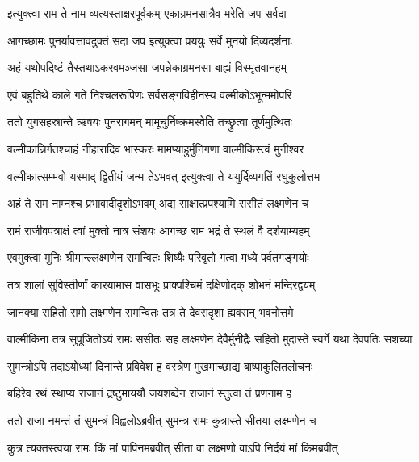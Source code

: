 \twolineshloka
{इत्युक्त्वा राम ते नाम व्यत्यस्ताक्षरपूर्वकम्}
{एकाग्रमनसात्रैव मरेति जप सर्वदा} %

\twolineshloka
{आगच्छामः पुनर्यावत्तावदुक्तं सदा जप}
{इत्युक्त्वा प्रययुः सर्वे मुनयो दिव्यदर्शनाः} %

\twolineshloka
{अहं यथोपदिष्टं तैस्तथाऽकरवमञ्जसा}
{जपन्नेकाग्रमनसा बाह्यं विस्मृतवानहम्} %

\twolineshloka
{एवं बहुतिथे काले गते निश्चलरूपिणः}
{सर्वसङ्गविहीनस्य वल्मीकोऽभून्ममोपरि} %

\twolineshloka
{ततो युगसहस्रान्ते ऋषयः पुनरागमन्}
{मामूचुर्निष्क्रमस्वेति तच्छ्रुत्वा तूर्णमुत्थितः} %

\twolineshloka
{वल्मीकान्निर्गतश्चाहं नीहारादिव भास्करः}
{मामप्याहुर्मुनिगणा वाल्मीकिस्त्वं मुनीश्वर} %

\twolineshloka
{वल्मीकात्सम्भवो यस्माद् द्वितीयं जन्म तेऽभवत्}
{इत्युक्त्वा ते ययुर्दिव्यगतिं रघुकुलोत्तम} %

\twolineshloka
{अहं ते राम नाम्नश्च प्रभावादीदृशोऽभवम्}
{अद्य साक्षात्प्रपश्यामि ससीतं लक्ष्मणेन च} %

\twolineshloka
{रामं राजीवपत्राक्षं त्वां मुक्तो नात्र संशयः}
{आगच्छ राम भद्रं ते स्थलं वै दर्शयाम्यहम्} %

\twolineshloka
{एवमुक्त्वा मुनिः श्रीमान्ल्लक्ष्मणेन समन्वितः}
{शिष्यैः परिवृतो गत्वा मध्ये पर्वतगङ्गयोः} %

\twolineshloka
{तत्र शालां सुविस्तीर्णां कारयामास वासभूः}
{प्राक्पश्चिमं दक्षिणोदक् शोभनं मन्दिरद्वयम्} %

\twolineshloka
{जानक्या सहितो रामो लक्ष्मणेन समन्वितः}
{तत्र ते देवसदृशा ह्यवसन् भवनोत्तमे} %

\fourlineindentedshloka
{वाल्मीकिना तत्र सुपूजितोऽयं}
{रामः ससीतः सह लक्ष्मणेन}
{देवैर्मुनीद्रैः सहितो मुदास्ते}
{स्वर्गे यथा देवपतिः सशच्या} %





\twolineshloka
{सुमन्त्रोऽपि तदाऽयोध्यां दिनान्ते प्रविवेश ह}
{वस्त्रेण मुखमाच्छाद्य बाष्पाकुलितलोचनः} %

\twolineshloka
{बहिरेव रथं स्थाप्य राजानं द्रष्टुमाययौ}
{जयशब्देन राजानं स्तुत्वा तं प्रणनाम ह} %

\twolineshloka
{ततो राजा नमन्तं तं सुमन्त्रं विह्वलोऽब्रवीत्}
{सुमन्त्र रामः कुत्रास्ते सीतया लक्ष्मणेन च} %

\twolineshloka
{कुत्र त्यक्तस्त्वया रामः किं मां पापिनमब्रवीत्}
{सीता वा लक्ष्मणो वाऽपि निर्दयं मां किमब्रवीत्} %

